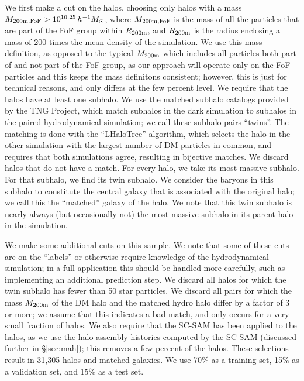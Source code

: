 We first make a cut on the \dark halos, choosing only halos with a mass $M_\mathrm{200m,FoF} > 10^{10.25} \, h^{-1} M_\mathrm{\odot}$, where $M_\mathrm{200m,FoF}$ is the mass of all the particles that are part of the FoF group within $R_\mathrm{200m}$, and $R_\mathrm{200m}$ is the radius enclosing a mass of 200 times the mean density of the simulation.
We use this mass definition, as opposed to the typical $M_\mathrm{200m}$ which includes all particles both part of and not part of the FoF group, as our approach will operate only on the FoF particles and this keeps the mass definitons consistent; however, this is just for technical reasons, and only differs at the few percent level.
We require that the halos have at least one subhalo.
We use the matched subhalo catalogs provided by the TNG Project, which match subhalos in the dark simulation to subhalos in the paired hydrodynamical simulation; we call these subhalo pairs ``twins''.
The matching is done with the ``LHaloTree'' algorithm, which selects the halo in the other simulation with the largest number of DM particles in common, and requires that both simulations agree, resulting in bijective matches.
We discard halos that do not have a \hydro match.
For every \dark halo, we take its most massive \dark subhalo.
For that \dark subhalo, we find its twin \hydro subhalo.
We consider the baryons in this subhalo to constitute the central galaxy that is associated with the original \dark halo; we call this the ``matched'' galaxy of the \dark halo. 
We note that this twin \hydro subhalo is nearly always (but occasionally not) the most massive subhalo in its parent halo in the \hydro simulation.

We make some additional cuts on this sample.
We note that some of these cuts are on the ``labels'' or otherwise require knowledge of the hydrodynamical simulation; in a full application this should be handled more carefully, such as implementing an additional prediction step. 
We discard all \dark halos for which the twin \hydro subhalo has fewer than 50 star particles.
We discard all pairs for which the mass $M_\mathrm{200m}$ of the DM halo and the matched hydro halo differ by a factor of 3 or more; we assume that this indicates a bad match, and only occurs for a very small fraction of halos.
We also require that the SC-SAM has been applied to the halos, as we use the halo assembly histories computed by the SC-SAM (discussed further in \S\ref{sec:mah}); this removes a few percent of the halos.
These selections result in 31,305 \dark halos and matched \hydro galaxies.
We use 70\% as a training set, 15\% as a validation set, and 15\% as a test set.


